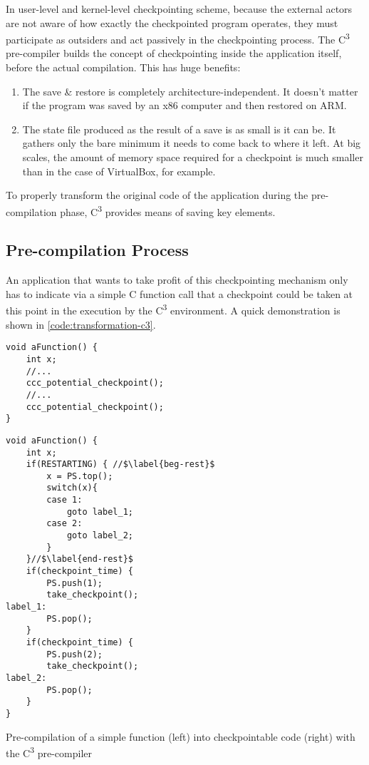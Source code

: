 In user-level and kernel-level checkpointing scheme, because the external actors are not aware of how exactly the checkpointed program operates, they must participate as outsiders and act passively in the checkpointing process. The C\textsuperscript{3} pre-compiler builds the concept of checkpointing inside the application itself, before the actual compilation. This has huge benefits:
\begin{enumerate}
	\item The save \& restore is completely architecture-independent. It doesn't matter if the program was saved by an x86 computer and then restored on ARM.
	\item The state file produced as the result of a save is as small is it can be. It gathers only the bare minimum it needs to come back to where it left. At big scales, the amount of memory space required for a checkpoint is much smaller than in the case of VirtualBox, for example.
\end{enumerate}

To properly transform the original code of the application during the pre-compilation phase, C\textsuperscript{3} provides means of saving key elements.

\subsection*{Pre-compilation Process}
An application that wants to take profit of this checkpointing mechanism only has to indicate via a simple C function call that a checkpoint could be taken at this point in the execution by the C\textsuperscript{3} environment. A quick demonstration is shown in \autoref{code:transformation-c3}.

\begin{listing}[H]
\centering
\begin{minipage}{.5\textwidth}
\begin{verbatim}
void aFunction() {
	int x;
	//...
	ccc_potential_checkpoint();
	//...
	ccc_potential_checkpoint();
}
\end{verbatim}
\centering

\end{minipage}%
\begin{minipage}{.5\textwidth}
\begin{verbatim}
void aFunction() {
	int x;
	if(RESTARTING) { //$\label{beg-rest}$
		x = PS.top();
		switch(x){
		case 1: 
			goto label_1;
		case 2: 
			goto label_2;
		}
	}//$\label{end-rest}$
	if(checkpoint_time) {
		PS.push(1);
		take_checkpoint();
label_1:
		PS.pop();
	}
	if(checkpoint_time) {
		PS.push(2);
		take_checkpoint();
label_2:
		PS.pop();
	}
}
\end{verbatim}
\end{minipage}
\caption{Pre-compilation of a simple function (left) into checkpointable code (right) with the C\textsuperscript{3} pre-compiler\cite{online:c3-ppt}}
\label{code:transformation-c3}
\end{listing}

